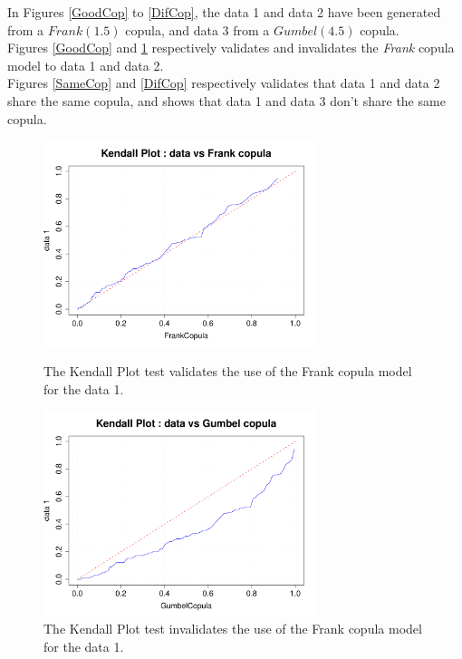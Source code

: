 {  In Figures  \ref{GoodCop} to \ref{DifCop}, the data 1 and data 2  have been generated from a $Frank(1.5)$ copula, and data 3 from a $Gumbel(4.5)$ copula.\\

  Figures \ref{GoodCop} and \ref{BadCop} respectively validates and invalidates the \textit{Frank} copula model to data 1 and data 2.\\

  Figures \ref{SameCop} and \ref{DifCop} respectively validates that data 1 and data 2 share the same copula, and shows that data 1 and data 3 don't share the same copula.

  \begin{figure}[H]
    \begin{minipage}{8cm}
      \begin{center}
        \includegraphics[width=8cm]{Figures/KendallPlotCopula.pdf}
      \end{center}
      \caption{The Kendall Plot test validates the use of the Frank copula model for the data 1.}
      \label{GoodCop}
    \end{minipage}
    \hfill
    \begin{minipage}{8cm}
      \begin{center}
        \includegraphics[width=8cm]{Figures/KendallPlotCopulaBad.pdf}
      \end{center}
      \caption{The Kendall Plot test invalidates the use of the Frank copula model for the data 1.}
      \label{BadCop}
    \end{minipage}
  \end{figure}


}
